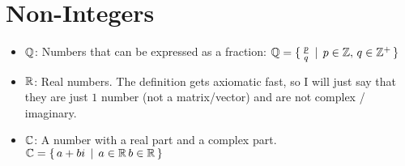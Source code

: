 \section{Non-Integers}
\begin{itemize}
    \item $\mathbb{Q}$: Numbers that can be expressed as a fraction: 
        $\mathbb{Q}=\{\, \frac{p}{q} \,\mid\, p\in\mathbb{Z},\, q\in\mathbb{Z}^+ \,\}$
    \item $\mathbb{R}$: Real numbers. The definition gets axiomatic fast, so I will just
                    say that they are just $1$ number (not a matrix/vector) and are
                    not complex / imaginary.
    \item $\mathbb{C}$: A number with a real part and a complex part. 
            $\mathbb{C} = \{\, a+bi \,\mid\, a\in\mathbb{R}\,b\in\mathbb{R}\,\}$
                       
\end{itemize}

